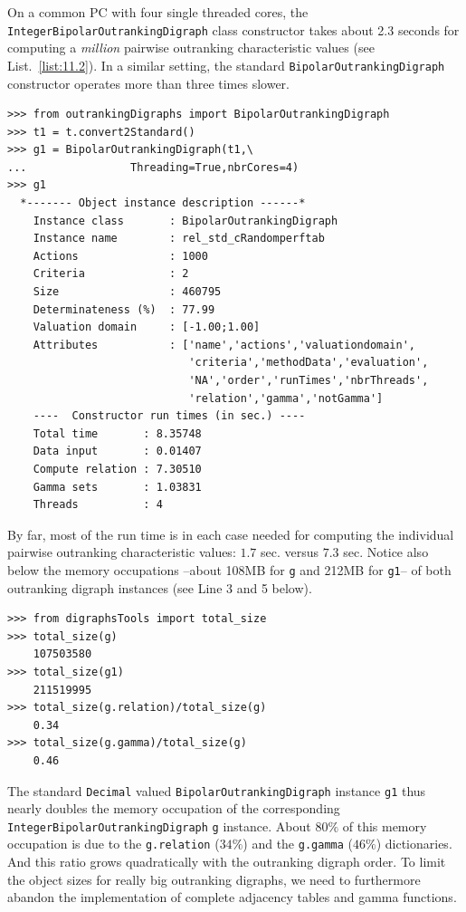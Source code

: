 On a common PC with four single threaded cores, the \texttt{IntegerBipolarOut\-rankingDigraph} class constructor takes about 2.3 seconds for computing a \emph{million} pairwise outranking characteristic values (see List.~\vref{list:11.2}). In a similar setting, the standard \texttt{BipolarOutranking\-Digraph} constructor operates more than three times slower.
\begin{lstlisting}
>>> from outrankingDigraphs import BipolarOutrankingDigraph
>>> t1 = t.convert2Standard()
>>> g1 = BipolarOutrankingDigraph(t1,\
...                Threading=True,nbrCores=4)
>>> g1
  *------- Object instance description ------*
    Instance class       : BipolarOutrankingDigraph
    Instance name        : rel_std_cRandomperftab
    Actions              : 1000
    Criteria             : 2
    Size                 : 460795
    Determinateness (%)  : 77.99
    Valuation domain     : [-1.00;1.00]
    Attributes           : ['name','actions','valuationdomain',
                            'criteria','methodData','evaluation',
                            'NA','order','runTimes','nbrThreads',
                            'relation','gamma','notGamma']
    ----  Constructor run times (in sec.) ----
    Total time       : 8.35748
    Data input       : 0.01407
    Compute relation : 7.30510
    Gamma sets       : 1.03831
    Threads          : 4
\end{lstlisting}

By far, most of the run time is in each case needed for computing the individual pairwise outranking characteristic values: $1.7$ sec. versus $7.3$ sec. Notice also below the memory occupations --about 108MB for \texttt{g} and 212MB for \texttt{g1}-- of both outranking digraph instances (see Line 3 and 5 below).
\begin{lstlisting}
>>> from digraphsTools import total_size
>>> total_size(g)
    107503580
>>> total_size(g1)
    211519995
>>> total_size(g.relation)/total_size(g)
    0.34
>>> total_size(g.gamma)/total_size(g)
    0.46
\end{lstlisting}

The standard \texttt{Decimal} valued \texttt{BipolarOutrankingDigraph} instance \texttt{g1} thus nearly doubles the memory occupation of the corresponding \texttt{IntegerBipo\-larOutrankingDigraph} \texttt{g} instance. About $80\%$ of this memory occupation is due to the \texttt{g.relation} ($34\%$) and the \texttt{g.gamma} ($46\%$) dictionaries. And this ratio grows quadratically with the outranking digraph order. To limit the object sizes for really big outranking digraphs, we need to furthermore abandon the implementation of complete adjacency tables and gamma functions.

